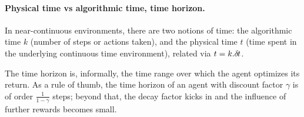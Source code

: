 


      \paragraph{Physical time vs algorithmic time, time horizon.}
        In near-continuous environments, there are two notions of time:
the algorithmic time $k$ (number of steps or actions taken), and the
physical time $t$ (time spent
in the underlying continuous time environment), related via
$t=k.{\delta\hspace{-.1em}t}$.

The time horizon is, informally, the time range over
which the agent optimizes its return.
As a rule of thumb,
the time horizon of an agent with discount factor $\gamma$ is
of order $\frac{1}{1 - \gamma}$ steps; beyond that, the decay factor
kicks in and the influence of further rewards becomes small.

